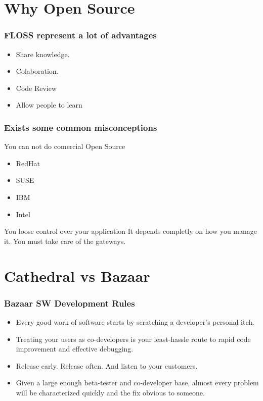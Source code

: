 \documentclass[hyperref={pdfpagelabels=false},xcolor=pst,pdf,fragile]{beamer}
\begin{document}
\section{Why Open Source}

\begin{frame}
  \frametitle{FLOSS represent a lot of advantages}

  \begin{itemize}
	\item Share knowledge.
	\item Colaboration.
	\item Code Review
	\item Allow people to learn
  \end{itemize}

\end{frame}

\begin{frame}
  \frametitle{Exists some common misconceptions}

  \begin{block}{You can not do comercial Open Source}
	\begin{itemize}
	  \item RedHat
	  \item SUSE
	  \item IBM
	  \item Intel
	\end{itemize}
  \end{block}

  \begin{block}{You loose control over your application}
	It depends completly on how you manage it. You must take care of the
	gateways.
  \end{block}

\end{frame}

\section{Cathedral vs Bazaar}


\begin{frame}
  \frametitle{Bazaar SW Development Rules}

  \begin{itemize}
	\item Every good work of software starts by scratching a developer's
	  personal itch.

	\item Treating your users as co-developers is your least-hassle route
	  to rapid code improvement and effective debugging.

	\item Release early. Release often. And listen to your customers.

	\item Given a large enough beta-tester and co-developer base, almost
	  every problem will be characterized quickly and the fix obvious to
	  someone.

  \end{itemize}

\end{frame}
\end{document}
